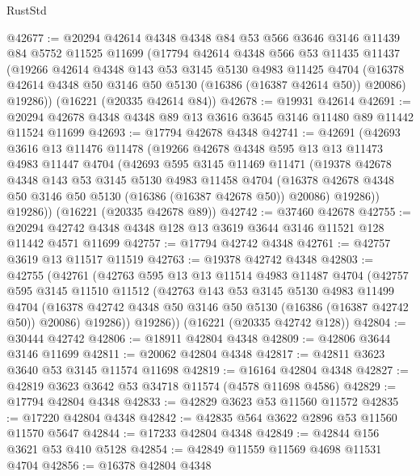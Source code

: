 \begin{lexlean}{RustStd}
\begin{coremodule}
@42677 := @20294
    @42614
    @4348
    @4348
    @84
    @53
    @566
    @3646
    @3146
    @11439
    @84
    @5752
    @11525
    @11699
    (@17794
      @42614
      @4348
      @566
      @53
      @11435
      @11437
      (@19266
        @42614
        @4348
        @143
        @53
        @3145
        @5130
        @4983
        @11425
        @4704
        (@16378 @42614 @4348 @50 @3146 @50 @5130 (@16386 (@16387 @42614 @50)) @20086)
        @19286))
    (@16221 (@20335 @42614 @84))
@42678 := @19931 @42614
@42691 := @20294 @42678 @4348 @4348 @89 @13 @3616 @3645 @3146 @11480 @89 @11442 @11524 @11699
@42693 := @17794 @42678 @4348
@42741 := @42691
    (@42693
      @3616
      @13
      @11476
      @11478
      (@19266
        @42678
        @4348
        @595
        @13
        @13
        @11473
        @4983
        @11447
        @4704
        (@42693
          @595
          @3145
          @11469
          @11471
          (@19378
            @42678
            @4348
            @143
            @53
            @3145
            @5130
            @4983
            @11458
            @4704
            (@16378 @42678 @4348 @50 @3146 @50 @5130 (@16386 (@16387 @42678 @50)) @20086)
            @19286))
        @19286))
    (@16221 (@20335 @42678 @89))
@42742 := @37460 @42678
@42755 := @20294 @42742 @4348 @4348 @128 @13 @3619 @3644 @3146 @11521 @128 @11442 @4571 @11699
@42757 := @17794 @42742 @4348
@42761 := @42757 @3619 @13 @11517 @11519
@42763 := @19378 @42742 @4348
@42803 := @42755
    (@42761
      (@42763
        @595
        @13
        @13
        @11514
        @4983
        @11487
        @4704
        (@42757
          @595
          @3145
          @11510
          @11512
          (@42763
            @143
            @53
            @3145
            @5130
            @4983
            @11499
            @4704
            (@16378 @42742 @4348 @50 @3146 @50 @5130 (@16386 (@16387 @42742 @50)) @20086)
            @19286))
        @19286))
    (@16221 (@20335 @42742 @128))
@42804 := @30444 @42742
@42806 := @18911 @42804 @4348
@42809 := @42806 @3644 @3146 @11699
@42811 := @20062 @42804 @4348
@42817 := @42811 @3623 @3640 @53 @3145 @11574 @11698
@42819 := @16164 @42804 @4348
@42827 := @42819 @3623 @3642 @53 @34718 @11574 (@4578 @11698 @4586)
@42829 := @17794 @42804 @4348
@42833 := @42829 @3623 @53 @11560 @11572
@42835 := @17220 @42804 @4348
@42842 := @42835 @564 @3622 @2896 @53 @11560 @11570 @5647
@42844 := @17233 @42804 @4348
@42849 := @42844 @156 @3621 @53 @410 @5128
@42854 := @42849 @11559 @11569 @4698 @11531 @4704
@42856 := @16378 @42804 @4348

\end{coremodule}
\end{lexlean}
